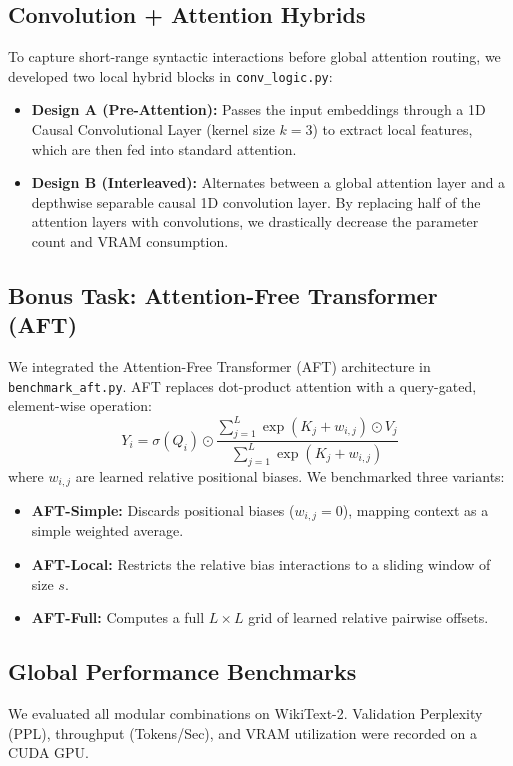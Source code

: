 \documentclass[11pt,a4paper]{article}
\begin{document}
\subsection{Convolution + Attention Hybrids}
To capture short-range syntactic interactions before global attention routing, we developed two local hybrid blocks in \texttt{conv\_logic.py}:
\begin{itemize}
    \item \textbf{Design A (Pre-Attention):} Passes the input embeddings through a 1D Causal Convolutional Layer (kernel size $k=3$) to extract local features, which are then fed into standard attention.
    \item \textbf{Design B (Interleaved):} Alternates between a global attention layer and a depthwise separable causal 1D convolution layer. By replacing half of the attention layers with convolutions, we drastically decrease the parameter count and VRAM consumption.
\end{itemize}

\subsection{Bonus Task: Attention-Free Transformer (AFT)}
We integrated the Attention-Free Transformer (AFT) architecture in \texttt{benchmark\_aft.py}. AFT replaces dot-product attention with a query-gated, element-wise operation:
\begin{equation}
Y_i = \sigma(Q_i) \odot \frac{\sum_{j=1}^L \exp(K_j + w_{i,j}) \odot V_j}{\sum_{j=1}^L \exp(K_j + w_{i,j})}
\end{equation}
where $w_{i,j}$ are learned relative positional biases. We benchmarked three variants:
\begin{itemize}
    \item \textbf{AFT-Simple:} Discards positional biases ($w_{i,j}=0$), mapping context as a simple weighted average.
    \item \textbf{AFT-Local:} Restricts the relative bias interactions to a sliding window of size $s$.
    \item \textbf{AFT-Full:} Computes a full $L \times L$ grid of learned relative pairwise offsets.
\end{itemize}

\subsection{Global Performance Benchmarks}
We evaluated all modular combinations on WikiText-2. Validation Perplexity (PPL), throughput (Tokens/Sec), and VRAM utilization were recorded on a CUDA GPU.
\end{document}
